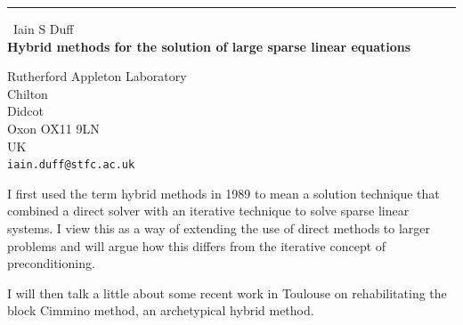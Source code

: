 \documentclass{report}
\begin{document}
\begin{center}
\rule{6in}{1pt} \
{\large Iain S Duff \\
{\bf Hybrid methods for the solution of large sparse linear equations}}

Rutherford Appleton Laboratory \\ Chilton \\ Didcot \\ Oxon OX11 9LN \\ UK
\\
{\tt iain.duff@stfc.ac.uk}\end{center}

I first used the term hybrid methods in 1989 to mean a solution technique that
combined a direct solver with an iterative technique to solve sparse linear
systems. I view this as a way of extending the use of direct methods to
larger problems and will argue how this differs from the iterative
concept of preconditioning.

I will then talk a little about some recent work in Toulouse on rehabilitating
the block Cimmino method, an archetypical hybrid method.
\end{document}
